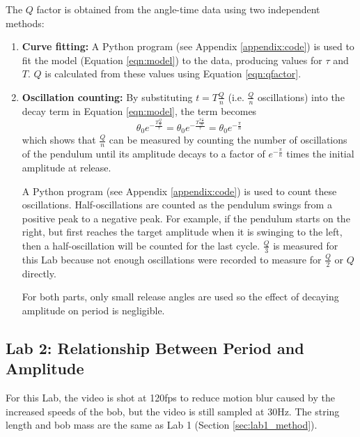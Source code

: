 \documentclass[aps,twocolumn,secnumarabic,nobalancelastpage,amsmath,amssymb,nofootinbib,floatfix,letterpaper]{revtex4}
\begin{document}
The \(Q\) factor is obtained from the angle-time data using two independent methods:
\begin{enumerate}
    \item
        \textbf{Curve fitting:} A Python program (see Appendix \ref{appendix:code}) is used to fit the model (Equation
        \ref{eqn:model}) to the data, producing values for \(\tau\) and \(T\). \(Q\) is calculated from these values
        using Equation \ref{eqn:qfactor}.
    \item
        \textbf{Oscillation counting:} By substituting \(t = T\frac{Q}{n}\) (i.e. \(\frac{Q}{n}\) oscillations) into
        the decay term in Equation \ref{eqn:model}, the term becomes
        \begin{equation}
            \theta_0 e^{-\frac{T\frac{Q}{n}}{\tau}} = \theta_0 e^{-\frac{T\frac{\pi\frac{\tau}{T}}{n}}{\tau}} = \theta_0 e^{-\frac{\pi}{n}}
        \end{equation}
        which shows that \(\frac{Q}{n}\) can be measured by counting the number of oscillations of the pendulum until
        its amplitude decays to a factor of \(e^{-\frac{\pi}{n}}\) times the initial amplitude at release.
        
        A Python program (see Appendix \ref{appendix:code}) is used to count these oscillations. Half-oscillations are
        counted as the pendulum swings from a positive peak to a negative peak. For example, if the pendulum starts on
        the right, but first reaches the target amplitude when it is swinging to the left, then a half-oscillation will
        be counted for the last cycle. \(\frac{Q}{3}\) is measured for this Lab because not enough oscillations were
        recorded to measure for \(\frac{Q}{2}\) or \(Q\) directly.

        For both parts, only small release angles are used so the effect of decaying amplitude on period is negligible.
\end{enumerate}

\subsection{Lab 2: Relationship Between Period and Amplitude}
\label{sec:lab2_method}

For this Lab, the video is shot at 120fps to reduce motion blur caused by the increased speeds of the bob, but the video
is still sampled at 30Hz. The string length and bob mass are the same as Lab 1 (Section \ref{sec:lab1_method}).
\end{document}
